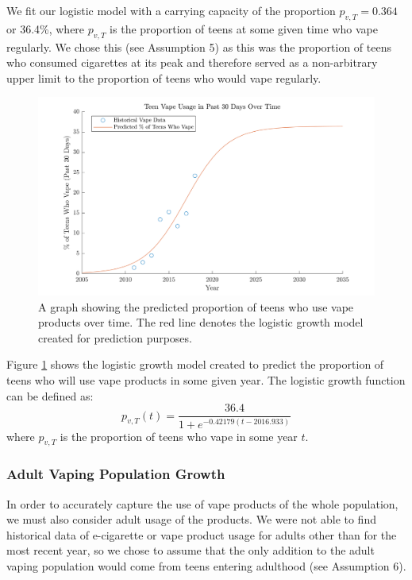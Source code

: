 \documentclass[12pt]{article}
\begin{document}
We fit our logistic model \cite{logReg} with a carrying capacity of the proportion $p_{v,T} = 0.364$ or 36.4\%, where $p_{v,T}$ is the proportion of teens at some given time who vape regularly. We chose this (see Assumption 5) as this was the proportion of teens who consumed cigarettes at its peak and therefore served as a non-arbitrary upper limit to the proportion of teens who would vape regularly.

\begin{figure}
    \centering
    \includegraphics[width=\textwidth]{"Teen Vape Usage Graph"}
    \caption{A graph showing the predicted proportion of teens who use vape products over time. The red line denotes the logistic growth model created for prediction purposes.}
    \label{fig:predTeenProp}
\end{figure}

Figure \ref{fig:predTeenProp} shows the logistic growth model created to predict the proportion of teens who will use vape products in some given year. The logistic growth function can be defined as:
\begin{equation}
    p_{v,T}(t)=\frac{36.4}{1+e^{-0.42179\left(t-2016.933\right)}}
\end{equation}
\noindent where $p_{v,T}$ is the proportion of teens who vape in some year $t$.

\subsubsection{Adult Vaping Population Growth}
In order to accurately capture the use of vape products of the whole population, we must also consider adult usage of the products. We were not able to find historical data of e-cigarette or vape product usage for adults other than for the most recent year, so we chose to assume that the only addition to the adult vaping population would come from teens entering adulthood (see Assumption 6). 
\end{document}
